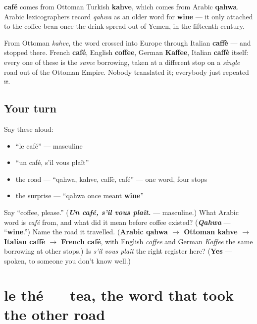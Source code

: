 \begin{cousinweb}
\textbf{café} comes from Ottoman Turkish \textbf{kahve}, which comes from Arabic \textbf{qahwa}. Arabic lexicographers record \emph{qahwa} as an older word for \textbf{wine} — it only attached to the coffee bean once the drink spread out of Yemen, in the fifteenth century.

From Ottoman \emph{kahve}, the word crossed into Europe through Italian \textbf{caffè} — and stopped there. French \textbf{café}, English \textbf{coffee}, German \textbf{Kaffee}, Italian \textbf{caffè} itself: every one of these is the \emph{same} borrowing, taken at a different stop on a \emph{single} road out of the Ottoman Empire. Nobody translated it; everybody just repeated it.
\end{cousinweb}

\subsection*{Your turn}
Say these aloud:

\begin{itemize}
\raggedright
  \item \textquotedblleft{}le café\textquotedblright{} — masculine
  \item \textquotedblleft{}un café, s'il vous plaît\textquotedblright{}
  \item the road — \textquotedblleft{}qahwa, kahve, caffè, café\textquotedblright{} — one word, four stops
  \item the surprise — \textquotedblleft{}qahwa once meant \textbf{wine}\textquotedblright{}
\end{itemize}

\begin{tcolorbox}[breakable,colback=teal!4,colframe=teal!35!black,title={Before you move on}]
Say \textquotedblleft{}coffee, please.\textquotedblright{} (\emph{\textbf{Un café, s'il vous plaît.}} — masculine.) What Arabic word is \emph{café} from, and what did it mean before coffee existed? (\emph{\textbf{Qahwa}} — \textquotedblleft{}\textbf{wine}.\textquotedblright{}) Name the road it travelled. (\textbf{Arabic qahwa $\to$ Ottoman kahve $\to$ Italian caffè $\to$ French café}, with English \emph{coffee} and German \emph{Kaffee} the same borrowing at other stops.) Is \emph{s'il vous plaît} the right register here? (\textbf{Yes} — spoken, to someone you don't know well.)
\end{tcolorbox}
\section[le thé]{le thé — tea, the word that took the other road}

